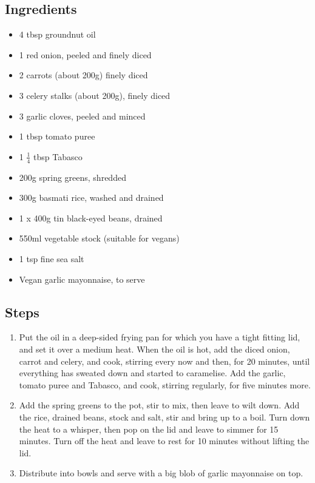\documentclass{book}
\begin{document}
\subsection*{Ingredients}
\begin{itemize}
\item 4 tbsp groundnut oil
\item 1 red onion, peeled and finely diced
\item 2 carrots (about 200g) finely diced
\item 3 celery stalks (about 200g), finely diced
\item 3 garlic cloves, peeled and minced
\item 1 tbsp tomato puree
\item 1 $\frac{1}{4}$ tbsp Tabasco 
\item 200g spring greens, shredded
\item 300g basmati rice, washed and drained
\item 1 x 400g tin black-eyed beans, drained
\item 550ml vegetable stock (suitable for vegans)
\item 1 tsp fine sea salt
\item Vegan garlic mayonnaise, to serve
\end{itemize}

\subsection*{Steps}
\begin{enumerate}
\item Put the oil in a deep-sided frying pan for which you have a tight fitting lid, and set it over a medium heat. When the oil is hot, add the diced onion, carrot and celery, and cook, stirring every now and then, for 20 minutes, until everything has sweated down and started to caramelise. Add the garlic, tomato puree and Tabasco, and cook, stirring regularly, for five minutes more.
\item Add the spring greens to the pot, stir to mix, then leave to wilt down. Add the rice, drained beans, stock and salt, stir and bring up to a boil. Turn down the heat to a whisper, then pop on the lid and leave to simmer for 15 minutes. Turn off the heat and leave to rest for 10 minutes without lifting the lid.
\item Distribute into bowls and serve with a big blob of garlic mayonnaise on top.
\end{enumerate}
\newpage
\end{document}
